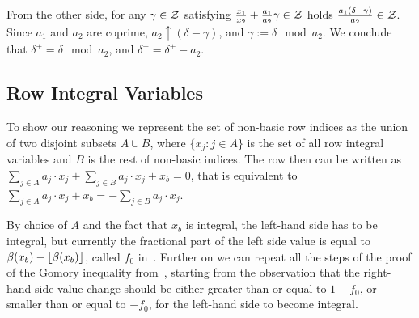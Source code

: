 From the other side, for any $\gamma \in \mathcal{Z}$ satisfying $\frac{x_1}{x_2}+\frac{a_1}{a_2}\gamma \in \mathcal{Z}$
holds $\frac{a_1(\delta - \gamma)}{a_2} \in \mathcal{Z}$. 
Since $a_1$ and $a_2$ are coprime, $a_2 \uparrow (\delta - \gamma)$, and $\gamma := \delta \mod a_2$. We conclude that $\delta^+ = \delta \mod a_2$, and $\delta^{-} = \delta^+ - a_2$.

\subsection{Row Integral Variables}
\label{app:row-integral}

To show our reasoning we represent the set of non-basic row indices as the union of two disjoint subsets $A \cup B$, where $\{x_j:j \in A\}$ is the set of all row integral variables and $B$ is the rest of non-basic indices.
The row then can be written as $\sum_{j \in A} a_j\cdot x_j + \sum_{j \in B} a_j\cdot x_j + x_b = 0$, that is equivalent to $\sum_{j \in A} a_j\cdot x_j + x_b = -\sum_{j \in B} a_j\cdot x_j$. 

By choice of $A$ and the fact that $x_b$ is integral, the left-hand side has to be integral, but currently the fractional part of the left side value is equal to $\beta(x_b) - \lfloor \beta(x_b) \rfloor$, called $f_0$ in~\cite{DutertreM06}. Further on we can repeat all the steps of the proof of the Gomory inequality from~\cite{DutertreM06}, starting from the observation that the right-hand side value change should be either greater than or equal to $1 - f_0$, or smaller than or equal to $-f_0$, for the left-hand side to become integral.

